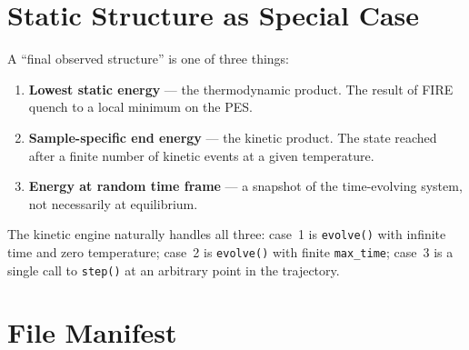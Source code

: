 \documentclass[11pt]{article}
\begin{document}
\section{Static Structure as Special Case}
\label{sec:static}

A ``final observed structure'' is one of three things:

\begin{enumerate}[leftmargin=2em]
  \item \textbf{Lowest static energy} --- the thermodynamic product.
        The result of FIRE quench to a local minimum on the PES\@.
  \item \textbf{Sample-specific end energy} --- the kinetic product.
        The state reached after a finite number of kinetic events at a
        given temperature.
  \item \textbf{Energy at random time frame} --- a snapshot of the
        time-evolving system, not necessarily at equilibrium.
\end{enumerate}

The kinetic engine naturally handles all three:
case~1 is \texttt{evolve()} with infinite time and zero temperature;
case~2 is \texttt{evolve()} with finite \texttt{max\_time};
case~3 is a single call to \texttt{step()} at an arbitrary point in the
trajectory.

\section{File Manifest}
\label{sec:files}
\end{document}
